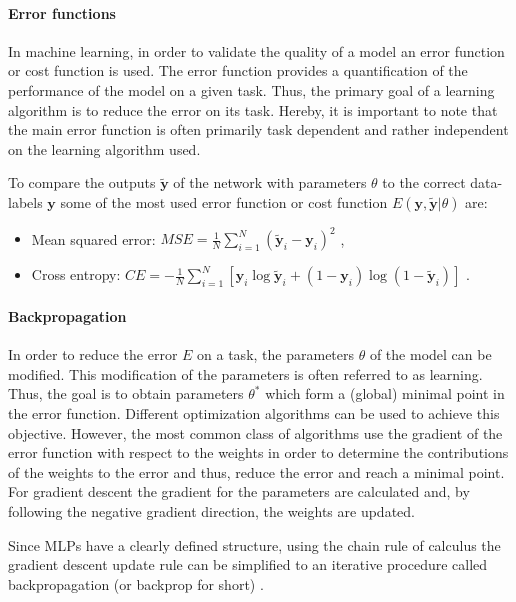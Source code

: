 \paragraph{Error functions} \label{c:mlperr}

In machine learning, in order to validate the quality of a model an error function or cost function is used.
The error function provides a quantification of the performance of the model on a given task.
Thus, the primary goal of a learning algorithm is to reduce the error on its task.
Hereby, it is important to note that the main error function is often primarily task dependent and rather independent on the learning algorithm used.  

To compare the outputs $\tilde{\textbf{y}}$ of the network with parameters $\theta$ to the correct data-labels $\textbf{y}$ some of the most used error function or cost function $E(\textbf{y},\tilde{\textbf{y}} | \theta)$ are:

\begin{itemize}
	\item Mean squared error: $MSE = \frac{1}{N} \sum_{i=1}^N (\tilde{\textbf{y}}_i - \textbf{y}_i)^2 $ ,
	\item Cross entropy: $CE = - \frac{1}{N} \sum_{i=1}^N [ \textbf{y}_i \log \tilde{\textbf{y}}_i + (1 - \textbf{y}_i) \log (1 - \tilde{\textbf{y}}_i)]$ .
\end{itemize}

\paragraph{Backpropagation} \label{c:backprop}

In order to reduce the error $E$ on a task, the parameters $\theta$ of the model can be modified.
This modification of the parameters is often referred to as learning.
Thus, the goal is to obtain parameters $\theta^*$ which form a (global) minimal point in the error function. 
Different optimization algorithms can be used to achieve this objective.
However, the most common class of algorithms use the gradient of the error function with respect to the weights in order to determine the contributions of the weights to the error and thus, reduce the error and reach a minimal point.
For gradient descent the gradient for the parameters are calculated and, by following the negative gradient direction, the weights are updated.

Since MLPs have a clearly defined structure, using the chain rule of calculus the gradient descent update rule can be simplified to an iterative procedure called backpropagation (or backprop for short)  \cite{Goodfellow-et-al-2016-Book, rumelhart1985learning}.

